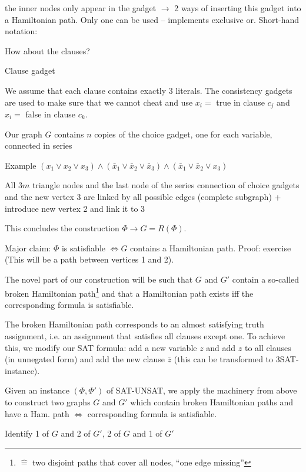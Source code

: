 \documentclass[11pt]{article}
\theoremstyle{definition}
\theoremstyle{definition}
\begin{document}
the inner nodes only appear in the gadget $ \rightarrow $ 2 ways of inserting this gadget into a Hamiltonian path. Only one can be used – implements exclusive or. Short-hand notation: %

How about the clauses?

Clause gadget %

We assume that each clause contains exactly 3 literals. The consistency gadgets are used to make sure that we cannot cheat and use $ x_i = $ true in clause $ c_j $ and $ x_i = $ false in clause $ c_k $.

Our graph $ G $ contains $ n $ copies of the choice gadget, one for each variable, connected in series


Example $ (x_1 \vee x_2 \vee x_3 ) \wedge (\bar x_1 \vee \bar x_2 \vee \bar x_3 ) \wedge (\bar x_1 \vee \bar x_2 \vee x_3 ) $

All $ 3m $ triangle nodes and the last node of the series connection of choice gadgets and the new vertex 3 are linked by all possible edges (complete subgraph) + introduce new vertex 2 and link it to 3

This concludes the construction $ \Phi \rightarrow G = R( \Phi )$.

Major claim: $ \Phi $ is satisfiable $ \Leftrightarrow G $ contains a Hamiltonian path. Proof: exercise (This will be a path between vertices 1 and 2).

The novel part of our construction will be such that $ G $ and $ G' $ contain a so-called broken Hamiltonian path\footnote{$ \hat = $ two disjoint paths that cover all nodes, ``one edge missing''} and that a Hamiltonian path exists iff the corresponding formula is satisfiable.

The broken Hamiltonian path corresponds to an almost satisfying truth assignment, i.e. an assignment that satisfies all clauses except one. To achieve this, we modify our SAT formula: add a new variable $ z $ and add $ z $ to all clauses (in unnegated form) and add the new clause $ \bar z $ (this can be transformed to 3SAT-instance).

Given an instance $( \Phi, \Phi' )$ of SAT-UNSAT, we apply the machinery from above to construct two graphs $ G $ and $ G' $ which contain broken Hamiltonian paths and have a Ham. path $ \Leftrightarrow $ corresponding formula is satisfiable.


Identify 1 of $ G $ and 2 of $ G' $, 2 of $ G $ and 1 of $ G' $
\end{document}
